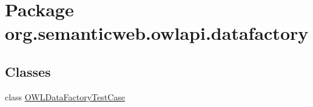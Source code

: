 \hypertarget{namespaceorg_1_1semanticweb_1_1owlapi_1_1datafactory}{\section{Package org.\-semanticweb.\-owlapi.\-datafactory}
\label{namespaceorg_1_1semanticweb_1_1owlapi_1_1datafactory}
}
\subsection*{Classes}
\begin{DoxyCompactItemize}
\item 
class \hyperlink{classorg_1_1semanticweb_1_1owlapi_1_1datafactory_1_1_o_w_l_data_factory_test_case}{O\-W\-L\-Data\-Factory\-Test\-Case}
\end{DoxyCompactItemize}
